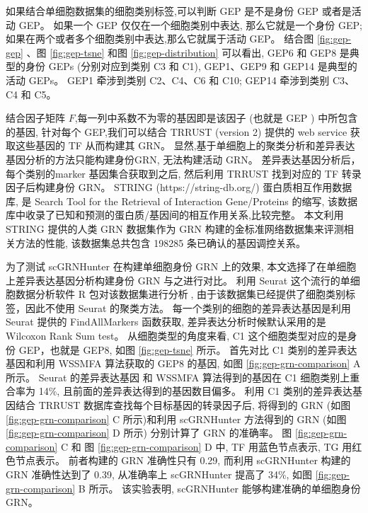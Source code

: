 如果结合单细胞数据集的细胞类别标签,可以判断 GEP 是不是身份 GEP 或者是活动 GEP。
如果一个 GEP 仅仅在一个细胞类别中表达, 那么它就是一个身份 GEP;
如果在两个或者多个细胞类别中表达,那么它就属于活动 GEP。
结合图 \ref{fig:gep-gep} 、图 \ref{fig:gep-tsne} 和图 \ref{fig:gep-distribution} 可以看出, 
GEP6 和 GEP8 是典型的身份 GEPs (分别对应到类别 C3 和 C1), GEP1、GEP9 和 GEP14 是典型的活动 GEPs。
GEP1 牵涉到类别 C2、C4、C6 和 C10; GEP14 牵涉到类别 C3、C4 和 C5。


结合因子矩阵 $F$,每一列中系数不为零的基因即是该因子 (也就是 GEP ) 中所包含的基因,
针对每个 GEP,我们可以结合 TRRUST (version 2) 提供的 web service 获取这些基因的 TF 从而构建其 GRN。
显然,基于单细胞上的聚类分析和差异表达基因分析的方法只能构建身份GRN, 无法构建活动 GRN。
差异表达基因分析后，每个类别的marker 基因集合获取到之后, 
然后利用 TRRUST 找到对应的 TF 转录因子后构建身份 GRN。
STRING (https://string-db.org/) 蛋白质相互作用数据库,
是 Search Tool for the Retrieval of Interaction Gene/Proteins 的缩写,
该数据库中收录了已知和预测的蛋白质/基因间的相互作用关系,比较完整。
本文利用 STRING 提供的人类 GRN 数据集作为 GRN 构建的金标准网络数据集来评测相关方法的性能, 该数据集总共包含 198285 条已确认的基因调控关系。

为了测试 scGRNHunter 在构建单细胞身份 GRN 上的效果,
本文选择了在单细胞上差异表达基因分析构建身份 GRN 与之进行对比。 
利用 Seurat 这个流行的单细胞数据分析软件 R 包对该数据集进行分析,
由于该数据集已经提供了细胞类别标签，因此不使用 Seurat 的聚类方法。
每一个类别的细胞的差异表达基因是利用 Seurat 提供的 FindAllMarkers 函数获取, 差异表达分析时候默认采用的是 Wilcoxon Rank Sum test。
从细胞类型的角度来看, C1 这个细胞类型对应的是身份 GEP，也就是 GEP8, 如图 \ref{fig:gep-tsne} 所示。
首先对比 C1 类别的差异表达基因和利用 WSSMFA 算法获取的 GEP8 的基因, 如图 \ref{fig:gep-grn-comparison} A 所示。
Seurat 的差异表达基因 和 WSSMFA 算法得到的基因在 C1 细胞类别上重合率为 14\%, 且前面的差异表达得到的基因数目偏多。 
利用 C1 类别的差异表达基因结合 TRRUST 数据库查找每个目标基因的转录因子后, 将得到的 GRN (如图 \ref{fig:gep-grn-comparison} C 所示)和利用 scGRNHunter 方法得到的 GRN (如图 \ref{fig:gep-grn-comparison} D 所示)
分别计算了 GRN 的准确率。
图 \ref{fig:gep-grn-comparison} C 和 图 \ref{fig:gep-grn-comparison} D 中, TF 用蓝色节点表示, TG 用红色节点表示。
前者构建的 GRN 准确性只有 0.29, 
而利用 scGRNHunter 构建的 GRN 准确性达到了 0.39, 从准确率上 scGRNHunter 提高了 34\%, 如图 \ref{fig:gep-grn-comparison} B 所示。
该实验表明, scGRNHunter 能够构建准确的单细胞身份 GRN。

